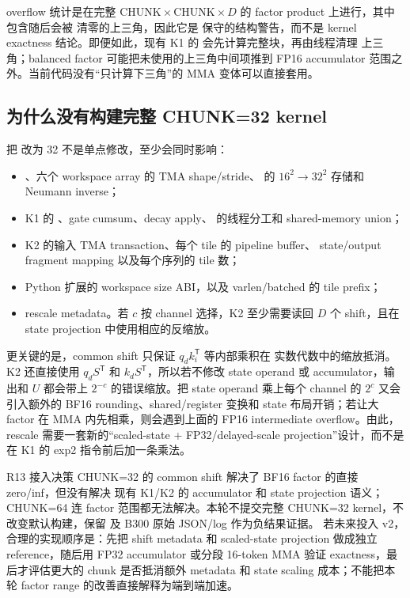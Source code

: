 overflow 统计是在完整 \(\text{CHUNK}\times\text{CHUNK}\times D\) 的 factor
product 上进行，其中包含随后会被  清零的上三角，因此它是
保守的结构警告，而不是 kernel exactness 结论。即便如此，现有 K1 的
 会先计算完整块，再由线程清理
上三角；balanced factor 可能把未使用的上三角中间项推到 FP16 accumulator
范围之外。当前代码没有“只计算下三角”的 MMA 变体可以直接套用。

\subsection{为什么没有构建完整 CHUNK=32 kernel}

把  改为 32 不是单点修改，至少会同时影响：

\begin{itemize}
  \item {}、六个 workspace array 的 TMA shape/stride、
         的 \(16^2\to32^2\) 存储和 Neumann inverse；
  \item K1 的 、gate cumsum、decay apply、
         的线程分工和 shared-memory union；
  \item K2 的输入 TMA transaction、每个 tile 的 pipeline buffer、
        state/output fragment mapping 以及每个序列的 tile 数；
  \item Python 扩展的 workspace size ABI，以及 varlen/batched 的 tile prefix；
  \item rescale metadata。若 \(c\) 按 channel 选择，K2 至少需要读回
        \(D\) 个 shift，且在 state projection 中使用相应的反缩放。
\end{itemize}

更关键的是，common shift 只保证 \(q_d k_i^\mathsf{T}\) 等内部乘积在
实数代数中的缩放抵消。K2 还直接使用 \(q_dS^\mathsf{T}\) 和
\(k_dS^\mathsf{T}\)，所以若不修改 state operand 或 accumulator，输出和
\(U\) 都会带上 \(2^{-c}\) 的错误缩放。把 state operand 乘上每个 channel
的 \(2^c\) 又会引入额外的 BF16 rounding、shared/register 变换和 state
布局开销；若让大 factor 在 MMA 内先相乘，则会遇到上面的 FP16 intermediate
overflow。由此，rescale 需要一套新的“scaled-state + FP32/delayed-scale
projection”设计，而不是在 K1 的 exp2 指令前后加一条乘法。

\begin{decision}{R13 接入决策}
CHUNK=32 的 common shift 解决了 BF16 factor 的直接 zero/inf，但没有解决
现有 K1/K2 的 accumulator 和 state projection 语义；CHUNK=64 连 factor
范围都无法解决。本轮不提交完整 CHUNK=32 kernel，不改变默认构建，保留
 及 B300 原始 JSON/log 作为负结果证据。
若未来投入 v2，合理的实现顺序是：先把 shift metadata 和 scaled-state
projection 做成独立 reference，随后用 FP32 accumulator 或分段 16-token
MMA 验证 exactness，最后才评估更大的 chunk 是否抵消额外 metadata 和
state scaling 成本；不能把本轮 factor range 的改善直接解释为端到端加速。
\end{decision}

